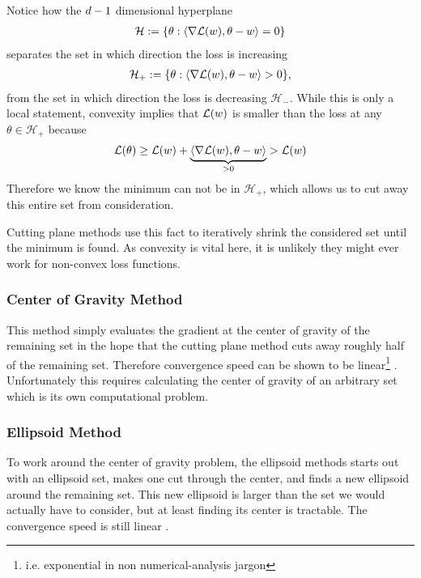 Notice how the \(d-1\) dimensional hyperplane
\begin{align*}
	\mathcal{H}
	:= \{\theta : \langle \nabla\mathcal{L}(w), \theta - w \rangle = 0\}
\end{align*}
separates the set in which direction the loss is increasing
\begin{align*}
	\mathcal{H}_+
	:= \{\theta : \langle \nabla\mathcal{L}(w), \theta - w \rangle > 0\},
\end{align*}
from the set in which direction the loss is decreasing \(\mathcal{H}_-\). While
this is only a local statement, convexity implies that \(\mathcal{L}(w)\) is
smaller than the loss at any \(\theta\in\mathcal{H}_+\) because
\begin{align*}
	\mathcal{L}(\theta)
	\ge \mathcal{L}(w) + \underbrace{\langle \nabla\mathcal{L}(w), \theta -w\rangle}_{>0}
	> \mathcal{L}(w)
\end{align*}
Therefore we know the minimum can not be in \(\mathcal{H}_+\), which allows us
to cut away this entire set from consideration.

Cutting plane methods use this fact to iteratively shrink the considered set
until the minimum is found. As convexity is vital here, it is unlikely they
might ever work for non-convex loss functions.

\subsubsection{Center of Gravity Method}

This method simply evaluates the gradient at the center of gravity of the
remaining set in the hope that the cutting plane method cuts away roughly half
of the remaining set. Therefore convergence speed can be shown to be
linear\footnote{i.e. exponential in non numerical-analysis jargon} 
\parencite[e.g.][Theorem 2.1]{bubeckConvexOptimizationAlgorithms2015}.
Unfortunately this requires calculating the center of gravity of an arbitrary
set which is its own computational problem. 

\subsubsection{Ellipsoid Method}

To work around the center of gravity problem, the ellipsoid methods starts out
with an ellipsoid set, makes one cut through the center, and finds a new
ellipsoid around the remaining set. This new ellipsoid is larger than the
set we would actually have to consider, but at least finding its center is
tractable. The convergence speed is still linear \parencite[e.g][Theorem
2.4]{bubeckConvexOptimizationAlgorithms2015}.


